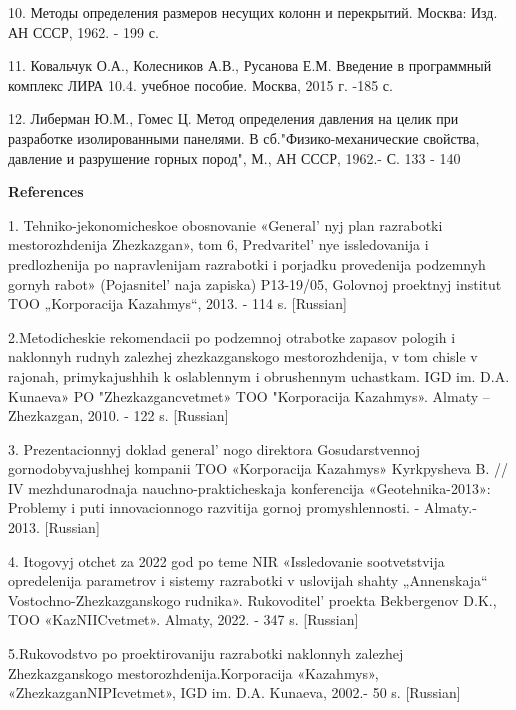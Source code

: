 \begin{references}
10. Методы определения размеров несущих колонн и перекрытий. Москва:
Изд. АН СССР, 1962. - 199 с.

11. Ковальчук О.А., Колесников А.В., Русанова Е.М. Введение в
программный комплекс ЛИРА 10.4. учебное пособие. Москва, 2015 г. -185 с.

12. Либерман Ю.М., Гомес Ц. Метод определения давления на целик при
разработке изолированными панелями. В сб."Физико-механические свойства,
давление и разрушение горных пород", М., АН СССР, 1962.- С. 133 - 140
\end{references}

\begin{center}
{\bfseries References}
\end{center}

\begin{references}

1. Tehniko-jekonomicheskoe obosnovanie «General' nyj plan
razrabotki mestorozhdenija Zhezkazgan», tom 6,
Predvaritel' nye issledovanija i predlozhenija po
napravlenijam razrabotki i porjadku provedenija podzemnyh gornyh rabot»
(Pojasnitel' naja zapiska) P13-19/05, Golovnoj proektnyj
institut TOO „Korporacija Kazahmys``, 2013. - 114 s. {[}Russian{]}

2.Metodicheskie rekomendacii po podzemnoj otrabotke zapasov pologih i
naklonnyh rudnyh zalezhej zhezkazganskogo mestorozhdenija, v tom chisle
v rajonah, primykajushhih k oslablennym i obrushennym uchastkam. IGD im.
D.A. Kunaeva» PO "Zhezkazgancvetmet» TOO "Korporacija Kazahmys». Almaty
-- Zhezkazgan, 2010. - 122 s. {[}Russian{]}

3. Prezentacionnyj doklad general' nogo direktora
Gosudarstvennoj gornodobyvajushhej kompanii TOO \linebreak«Korporacija Kazahmys»
Kyrkpysheva B. // IV mezhdunarodnaja nauchno-prakticheskaja konferencija
«Geotehnika-2013»: Problemy i puti innovacionnogo razvitija gornoj
promyshlennosti. - Almaty.- 2013. {[}Russian{]}

4. Itogovyj otchet za 2022 god po teme NIR «Issledovanie sootvetstvija
opredelenija parametrov i sistemy razrabotki v uslovijah shahty
„Annenskaja`` Vostochno-Zhezkazganskogo rudnika».
Rukovoditel'{} proekta Bekbergenov D.K., TOO
«KazNIICvetmet». Almaty, 2022. - 347 s. {[}Russian{]}

5.Rukovodstvo po proektirovaniju razrabotki naklonnyh zalezhej
Zhezkazganskogo mestorozhdenija.\linebreak Korporacija «Kazahmys»,
«ZhezkazganNIPIcvetmet», IGD im. D.A. Kunaeva, 2002.- 50 s.
{[}Russian{]}


\end{references}
